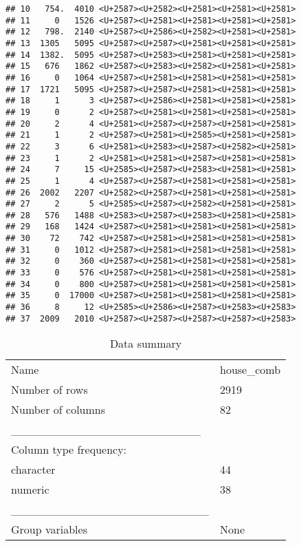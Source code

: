 \documentclass[
]{article}
\newenvironment{Shaded}{\begin{snugshade}}{\end{snugshade}}
\newcommand{\KeywordTok}[1]{\textcolor[rgb]{0.13,0.29,0.53}{\textbf{#1}}}
\newcommand{\NormalTok}[1]{#1}
\newcommand{\OperatorTok}[1]{\textcolor[rgb]{0.81,0.36,0.00}{\textbf{#1}}}
\newcommand{\OtherTok}[1]{\textcolor[rgb]{0.56,0.35,0.01}{#1}}
\newcommand{\StringTok}[1]{\textcolor[rgb]{0.31,0.60,0.02}{#1}}
\begin{document}
\begin{verbatim}
## 10   754.  4010 <U+2587><U+2582><U+2581><U+2581><U+2581>
## 11     0   1526 <U+2587><U+2581><U+2581><U+2581><U+2581>
## 12   798.  2140 <U+2587><U+2586><U+2582><U+2581><U+2581>
## 13  1305   5095 <U+2587><U+2587><U+2581><U+2581><U+2581>
## 14  1382.  5095 <U+2587><U+2583><U+2581><U+2581><U+2581>
## 15   676   1862 <U+2587><U+2583><U+2582><U+2581><U+2581>
## 16     0   1064 <U+2587><U+2581><U+2581><U+2581><U+2581>
## 17  1721   5095 <U+2587><U+2587><U+2581><U+2581><U+2581>
## 18     1      3 <U+2587><U+2586><U+2581><U+2581><U+2581>
## 19     0      2 <U+2587><U+2581><U+2581><U+2581><U+2581>
## 20     2      4 <U+2581><U+2587><U+2587><U+2581><U+2581>
## 21     1      2 <U+2587><U+2581><U+2585><U+2581><U+2581>
## 22     3      6 <U+2581><U+2583><U+2587><U+2582><U+2581>
## 23     1      2 <U+2581><U+2581><U+2587><U+2581><U+2581>
## 24     7     15 <U+2585><U+2587><U+2583><U+2581><U+2581>
## 25     1      4 <U+2587><U+2587><U+2581><U+2581><U+2581>
## 26  2002   2207 <U+2582><U+2587><U+2581><U+2581><U+2581>
## 27     2      5 <U+2585><U+2587><U+2582><U+2581><U+2581>
## 28   576   1488 <U+2583><U+2587><U+2583><U+2581><U+2581>
## 29   168   1424 <U+2587><U+2581><U+2581><U+2581><U+2581>
## 30    72    742 <U+2587><U+2581><U+2581><U+2581><U+2581>
## 31     0   1012 <U+2587><U+2581><U+2581><U+2581><U+2581>
## 32     0    360 <U+2587><U+2581><U+2581><U+2581><U+2581>
## 33     0    576 <U+2587><U+2581><U+2581><U+2581><U+2581>
## 34     0    800 <U+2587><U+2581><U+2581><U+2581><U+2581>
## 35     0  17000 <U+2587><U+2581><U+2581><U+2581><U+2581>
## 36     8     12 <U+2585><U+2586><U+2587><U+2583><U+2583>
## 37  2009   2010 <U+2587><U+2587><U+2587><U+2587><U+2583>
\end{verbatim}

\begin{Shaded}
\end{Shaded}

\begin{longtable}[]{@{}ll@{}}
\caption{Data summary}\tabularnewline
\toprule
\endhead
Name & house\_comb\tabularnewline
Number of rows & 2919\tabularnewline
Number of columns & 82\tabularnewline
\_\_\_\_\_\_\_\_\_\_\_\_\_\_\_\_\_\_\_\_\_\_\_ &\tabularnewline
Column type frequency: &\tabularnewline
character & 44\tabularnewline
numeric & 38\tabularnewline
\_\_\_\_\_\_\_\_\_\_\_\_\_\_\_\_\_\_\_\_\_\_\_\_ &\tabularnewline
Group variables & None\tabularnewline
\bottomrule
\end{longtable}
\end{document}
